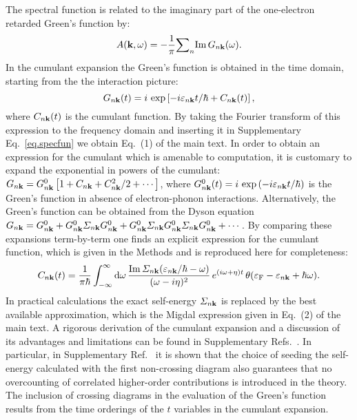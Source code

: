 \documentclass[12pt]{nature-mod}
\def\bk{{\bf k}}
\def\ve{\varepsilon}
\begin{document}
The spectral function is related to the imaginary part of the one-electron retarded Green's function by:
  \begin{equation} \label{eq.specfun}
  A(\bk,\omega)=-\frac{1}{\pi} {\sum}_n {\rm{Im}}\,G_{n\bk}(\omega).
  \end{equation}
In the cumulant expansion the Green's function is obtained in the time domain, starting from the
the interaction picture\cite{Langreth1970,Hedin1980,Aryasetiawan1996,Gumhalter2016}:
  \begin{equation}
  G_{n\bk}(t)=i\,\exp\left[-i\ve_{n\bk}t/\hbar+C_{n\bk}(t)\right],
  \end{equation}
where $C_{n\bk}(t)$ is the cumulant function. By taking the Fourier transform of this expression
to the frequency domain and inserting it in Supplementary Eq.~\eqref{eq.specfun} we obtain Eq.~(1) 
of the main text. 
In order to obtain an expression for the cumulant which is amenable to computation, it is customary 
to expand the exponential in powers of the cumulant: $G_{n\bk} = G_{n\bk}^0 \left[1 + C_{n\bk} + 
C_{n\bk}^2/2+\cdots\right]$, where $G_{n\bk}^0(t) = i\,\exp\left(-i\ve_{n\bk}t/\hbar\right)$ is
the Green's function in absence of electron-phonon interactions. Alternatively, the Green's function
can be obtained from the Dyson equation $G_{n\bk} = G_{n\bk}^0 + G_{n\bk}^0 \varSigma_{n\bk} G^0_{n\bk}
+ G_{n\bk}^0 \varSigma_{n\bk} G^0_{n\bk} \varSigma_{n\bk} G^0_{n\bk} + \cdots$. By comparing these
expansions term-by-term one finds an explicit expression for the cumulant function, which is
given in the Methods and is reproduced here for completeness:
  \begin{equation}\label{eq.cum-sigma}
  C_{n\bk}(t)=\frac{1}{\pi \hbar}\int_{-\infty}^{\infty}{\rm d}\omega \,
  \frac{{\rm Im}\,\varSigma_{n\bk}(\ve_{n\bk}/\hbar-\omega)}{(\omega-i\eta)^2}\,e^{(i\omega+\eta)t}
  \,\theta(\ve_{\rm F}-\ve_{n\bk}+\hbar\omega).
  \end{equation}
In practical calculations the exact self-energy $\varSigma_{n\bk}$ is replaced by the best available 
approximation, which is the Migdal expression given in Eq.~(2) of the main text. A rigorous derivation
of the cumulant expansion and a discussion of its advantages and limitations can be found in 
Supplementary Refs.~. In particular, in 
Supplementary Ref.~ it is shown that the choice of seeding 
the self-energy calculated with the first non-crossing diagram also 
guarantees that no overcounting of correlated higher-order contributions is introduced in the theory. 
The inclusion of crossing diagrams in the evaluation of the Green's function results from the time 
orderings of the $t$ variables in the cumulant expansion.
\end{document}
